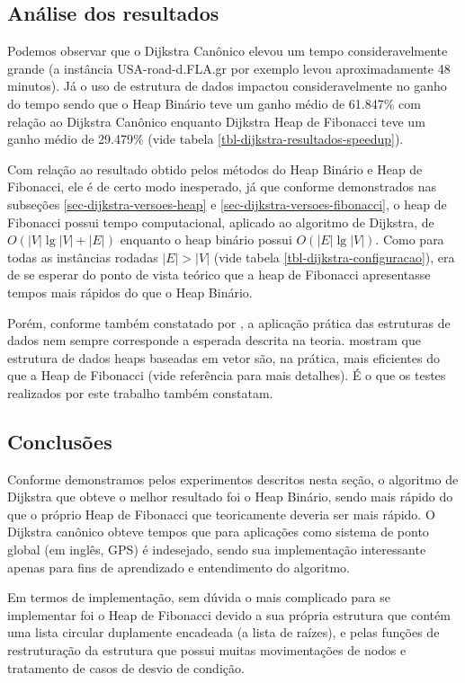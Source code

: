 \subsection{Análise dos resultados}
\label{sec-dijkstra-experimentos-analise}
Podemos observar que o Dijkstra Canônico elevou um tempo consideravelmente grande (a instância USA-road-d.FLA.gr por exemplo levou aproximadamente 48 minutos). Já o uso de estrutura de dados impactou consideravelmente no ganho do tempo sendo que o Heap Binário teve um ganho médio de 61.847\% com relação ao Dijkstra Canônico enquanto Dijkstra Heap de Fibonacci teve um ganho médio de 29.479\% (vide tabela \ref{tbl-dijkstra-resultados-speedup}).

Com relação ao resultado obtido pelos métodos do Heap Binário e Heap de Fibonacci, ele é de certo modo inesperado, já que conforme demonstrados nas subseções \ref{sec-dijkstra-versoes-heap} e \ref{sec-dijkstra-versoes-fibonacci}, o heap de Fibonacci possui tempo computacional, aplicado ao algoritmo de Dijkstra, de $O(|V|\lg |V| + |E|)$ enquanto o heap binário possui $O(|E| \lg |V|)$.  Como para todas as instâncias rodadas $|E| > |V|$ (vide tabela \ref{tbl-dijkstra-configuracao}), era de se esperar do ponto de vista teórico que a heap de Fibonacci apresentasse tempos mais rápidos do que o Heap Binário.

Porém, conforme também constatado por , a aplicação prática das estruturas de dados nem sempre corresponde a esperada descrita na teoria.  mostram que estrutura de dados heaps baseadas em vetor são, na prática, mais eficientes do que a Heap de Fibonacci (vide referência para mais detalhes). É o que os testes realizados por este trabalho também constatam.

\subsection{Conclusões}
\label{sec-dijkstra-conclusoes}
Conforme demonstramos pelos experimentos descritos nesta seção, o algoritmo de Dijkstra que obteve o melhor resultado foi o Heap Binário, sendo mais rápido do que o próprio Heap de Fibonacci que teoricamente deveria ser mais rápido. O Dijkstra canônico obteve tempos que para aplicações como sistema de ponto global (em inglês, GPS) é indesejado, sendo sua implementação interessante apenas para fins de aprendizado e entendimento do algoritmo.

Em termos de implementação, sem dúvida o mais complicado para se implementar foi o Heap de Fibonacci devido a sua própria estrutura que contém uma lista circular duplamente encadeada (a lista de raízes), e pelas funções de restruturação da estrutura que possui muitas movimentações de nodos e tratamento de casos de desvio de condição.


